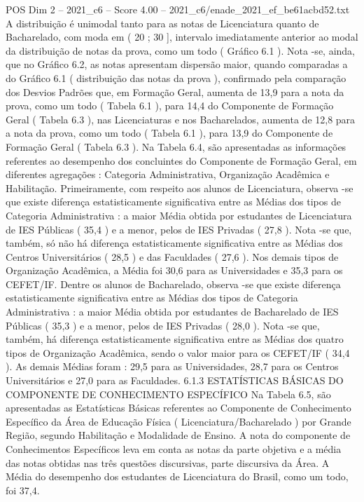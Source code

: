 \begin{textsample}{POS Dim 2 – 2021\_c6 – Score 4.00 – 2021\_c6/enade\_2021\_ef\_be61acbd52.txt}
A distribuição é unimodal tanto para as notas de Licenciatura quanto de Bacharelado, com moda em ( 20 ; 30 ], intervalo imediatamente anterior ao modal da distribuição de notas da prova, como um todo ( Gráfico 6.1 ).
Nota -se, ainda, que no Gráfico 6.2, as notas apresentam dispersão maior, quando comparadas a do Gráfico 6.1 ( distribuição das notas da prova ), confirmado pela comparação dos Desvios Padrões que, em Formação Geral, aumenta de 13,9 para a nota da prova, como um todo ( Tabela 6.1 ), para 14,4 do Componente de Formação Geral ( Tabela 6.3 ), nas Licenciaturas e nos Bacharelados, aumenta de 12,8 para a nota da prova, como um todo ( Tabela 6.1 ), para 13,9 do Componente de Formação Geral ( Tabela 6.3 ).
Na Tabela 6.4, são apresentadas as informações referentes ao desempenho dos concluintes do Componente de Formação Geral, em diferentes agregações : Categoria Administrativa, Organização Acadêmica e Habilitação.
Primeiramente, com respeito aos alunos de Licenciatura, observa -se que existe diferença estatisticamente significativa entre as Médias dos tipos de Categoria Administrativa : a maior Média obtida por estudantes de Licenciatura de IES Públicas ( 35,4 ) e a menor, pelos de IES Privadas ( 27,8 ).
Nota -se que, também, só não há diferença estatisticamente significativa entre as Médias dos Centros Universitários ( 28,5 ) e das Faculdades ( 27,6 ).
Nos demais tipos de Organização Acadêmica, a Média foi 30,6 para as Universidades e 35,3 para os CEFET/IF.
Dentre os alunos de Bacharelado, observa -se que existe diferença estatisticamente significativa entre as Médias dos tipos de Categoria Administrativa : a maior Média obtida por estudantes de Bacharelado de IES Públicas ( 35,3 ) e a menor, pelos de IES Privadas ( 28,0 ).
Nota -se que, também, há diferença estatisticamente significativa entre as Médias dos quatro tipos de Organização Acadêmica, sendo o valor maior para os CEFET/IF ( 34,4 ).
As demais Médias foram : 29,5 para as Universidades, 28,7 para os Centros Universitários e 27,0 para as Faculdades. 6.1.3 ESTATÍSTICAS BÁSICAS DO COMPONENTE DE CONHECIMENTO ESPECÍFICO Na Tabela 6.5, são apresentadas as Estatísticas Básicas referentes ao Componente de Conhecimento Específico da Área de Educação Física ( Licenciatura/Bacharelado ) por Grande Região, segundo Habilitação e Modalidade de Ensino.
A nota do componente de Conhecimentos Específicos leva em conta as notas da parte objetiva e a média das notas obtidas nas três questões discursivas, parte discursiva da Área.
A Média do desempenho dos estudantes de Licenciatura do Brasil, como um todo, foi 37,4.

\end{textsample}
